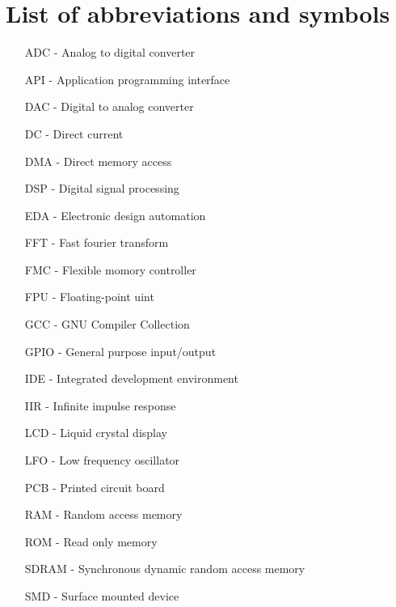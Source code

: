 \documentclass[a4paper,twoside,12pt]{book}
\begin{document}
\pagestyle{onlyPageNumbers}

\printbibliography




 

\chapter*{List of abbreviations and symbols}

\begin{itemize}
\item[ADC] - Analog to digital converter
\item[API] - Application programming interface
\item[DAC] - Digital to analog converter
\item[DC] - Direct current
\item[DMA] - Direct memory access
\item[DSP] - Digital signal processing
\item[EDA] - Electronic design automation
\item[FFT] - Fast fourier transform
\item[FMC] - Flexible momory controller
\item[FPU] - Floating-point uint
\item[GCC] - GNU Compiler Collection
\item[GPIO] - General purpose input/output
\item[IDE] - Integrated development environment
\item[IIR] - Infinite impulse response
\item[LCD] - Liquid crystal display
\item[LFO] - Low frequency oscillator
\item[PCB] - Printed circuit board
\item[RAM] - Random access memory
\item[ROM] - Read only memory
\item[SDRAM] - Synchronous dynamic random access memory
\item[SMD] - Surface mounted device
\end{itemize}
\end{document}
